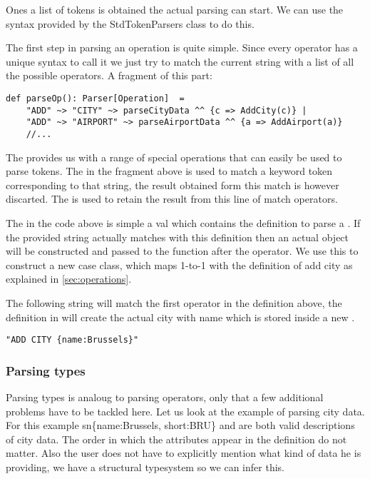 Ones a list of tokens is obtained the actual parsing can start. We can use the
syntax provided by the StdTokenParsers class to do this.

\par
The first step in parsing an operation is quite simple. Since every operator
has a unique syntax to call it we just try to match the current string with
a list of all the possible operators. A fragment of this part:

\begin{lstlisting}
def parseOp(): Parser[Operation]  =
    "ADD" ~> "CITY" ~> parseCityData ^^ {c => AddCity(c)} |
    "ADD" ~> "AIRPORT" ~> parseAirportData ^^ {a => AddAirport(a)}
    //...
\end{lstlisting}

\par
The  provides us with a range of special operations
that can easily be used to parse tokens. The \sn{\textasciitilde>} in the
fragment above is used to match a keyword token corresponding to that string,
the result obtained form this match is however discarted. The
\sn{\textasciicircum\textasciicircum} is used to retain the result from this
line of match operators. 

\par
The  in the code above is simple a val which contains the
definition to parse a . If the provided string actually
matches with this definition then an actual  object will be
constructed and passed to the function after the \sn{\textasciicircum\textasciicircum}
operator. We use this to construct a new  case class, which
maps 1-to-1 with the definition of add city as explained in
\ref{sec:operations}.

\par
The following string will match the first operator in the definition above, the
definition in  will create the actual city with name
 which is stored inside a new .

\begin{lstlisting}
"ADD CITY {name:Brussels}"
\end{lstlisting}


\subsubsection{Parsing types}

Parsing types is analoug to parsing operators, only that a few additional
problems have to be tackled here. Let us look at the example of parsing city
data. For this example sn{\{name:Brussels, short:BRU\}} and  are both valid descriptions of city data. The order in which
the attributes appear in the definition do not matter. Also the user does not
have to explicitly mention what kind of data he is providing, we have a
structural typesystem so we can infer this.

